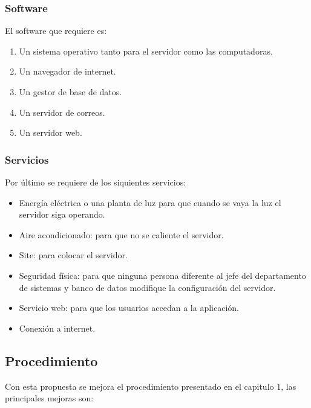 \subsubsection{Software}
El software que requiere es: 
\begin{enumerate}
	\item Un sistema operativo tanto para el servidor como las computadoras.
	\item Un navegador de internet.
	\item Un gestor de base de datos.
	\item Un servidor de correos.
	\item Un servidor web.
\end{enumerate}
\subsubsection{Servicios}

Por último se requiere de los siquientes servicios: 
\begin{itemize}
	\item Energía eléctrica o una planta de luz para que cuando se vaya la luz el servidor siga operando.
	\item Aire acondicionado: para que no se caliente el servidor.
	\item Site: para colocar el servidor.
	\item Seguridad física: para que ninguna persona diferente al jefe del departamento de sistemas y banco de datos modifique la configuración del servidor.
	\item Servicio web: para que los usuarios accedan a la aplicación. 
	\item Conexión a internet.
\end{itemize} 

\subsection{Procedimiento}
Con esta propuesta se mejora el procedimiento presentado en el capitulo 1, las principales mejoras son:

